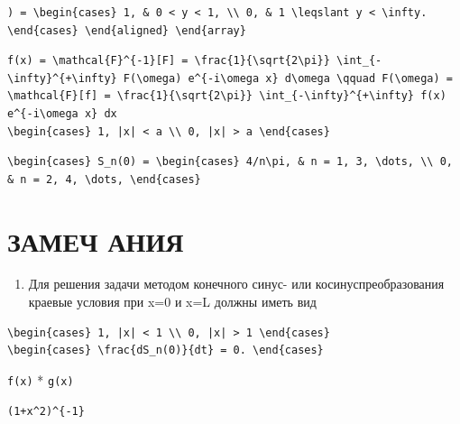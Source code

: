 \documentclass[
  ukrainian,
]{article}
\providecommand{\tightlist}{%
  \setlength{\itemsep}{0pt}\setlength{\parskip}{0pt}}
\begin{document}
\begin{verbatim}
) = \begin{cases} 1, & 0 < y < 1, \\ 0, & 1 \leqslant y < \infty. \end{cases} \end{aligned} \end{array}
\end{verbatim}

\begin{verbatim}
f(x) = \mathcal{F}^{-1}[F] = \frac{1}{\sqrt{2\pi}} \int_{-\infty}^{+\infty} F(\omega) e^{-i\omega x} d\omega \qquad F(\omega) = \mathcal{F}[f] = \frac{1}{\sqrt{2\pi}} \int_{-\infty}^{+\infty} f(x) e^{-i\omega x} dx
\begin{cases} 1, |x| < a \\ 0, |x| > a \end{cases}
\end{verbatim}

\begin{verbatim}
\begin{cases} S_n(0) = \begin{cases} 4/n\pi, & n = 1, 3, \dots, \\ 0, & n = 2, 4, \dots, \end{cases}
\end{verbatim}

\section{ЗАМЕЧ
АНИЯ}\label{ux437ux430ux43cux435ux447-ux430ux43dux438ux44f}

\begin{enumerate}
\def\labelenumi{\arabic{enumi}.}
\tightlist
\item
  Для решения задачи методом конечного синус- или косинуспреобразования
  краевые условия при x=0 и x=L должны иметь вид
\end{enumerate}

\begin{verbatim}
\begin{cases} 1, |x| < 1 \\ 0, |x| > 1 \end{cases}
\begin{cases} \frac{dS_n(0)}{dt} = 0. \end{cases}
\end{verbatim}

\texttt{f(x)} * \texttt{g(x)}

\begin{verbatim}
(1+x^2)^{-1}
\end{verbatim}
\end{document}
